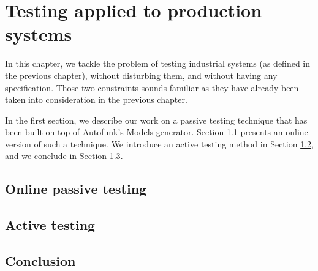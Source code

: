 %
\chapter{Testing applied to production systems}
\label{sec:testing}


In this chapter, we tackle the problem of testing industrial
systems (as defined in the previous chapter), without disturbing
them, and without having any specification. Those two constraints
sounds familiar as they have already been taken into
consideration in the previous chapter.

In the first section, we describe our work on a passive testing
technique that has been built on top of Autofunk's Models
generator. Section \ref{sec:testing:onpassive} presents an online
version of such a technique. We introduce an active testing
method in Section \ref{sec:testing:active}, and we conclude in
Section \ref{sec:testing:conclusion}.

\label{sec:testing:onpassive}



\section{Online passive testing}
\label{sec:testing:onpassive}

\section{Active testing}
\label{sec:testing:active}

\section{Conclusion}
\label{sec:testing:conclusion}
